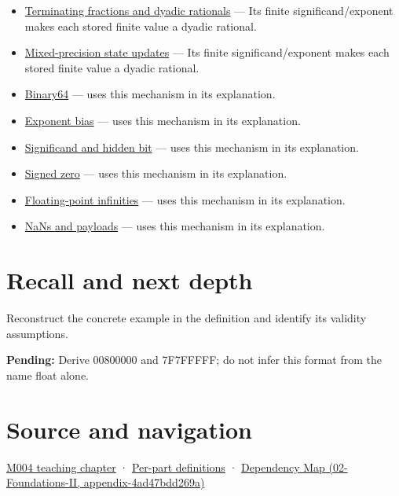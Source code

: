 \begin{itemize}
\item
  \hyperref[appendix-2a2f1b74bdd3]{Terminating fractions and dyadic rationals} --- Its finite significand/exponent makes each stored finite value a dyadic rational.
\item
  \hyperref[appendix-260182e617b7]{Mixed-precision state updates} --- Its finite significand/exponent makes each stored finite value a dyadic rational.
\item
  \hyperref[appendix-5078dfab64e6]{Binary64} --- uses this mechanism in its explanation.
\item
  \hyperref[appendix-2fae058c82e1]{Exponent bias} --- uses this mechanism in its explanation.
\item
  \hyperref[appendix-a24fd710cf67]{Significand and hidden bit} --- uses this mechanism in its explanation.
\item
  \hyperref[appendix-3a048f032c1f]{Signed zero} --- uses this mechanism in its explanation.
\item
  \hyperref[appendix-eb336149c00a]{Floating-point infinities} --- uses this mechanism in its explanation.
\item
  \hyperref[appendix-d6607cc4c235]{NaNs and payloads} --- uses this mechanism in its explanation.
\end{itemize}

\section{Recall and next depth}\label{appendix-5057f9ad327f-recall-and-next-depth}

Reconstruct the concrete example in the definition and identify its validity assumptions.

\textbf{Pending:} Derive 00800000 and 7F7FFFFF; do not infer this format from the name float alone.

\section{Source and navigation}\label{appendix-5057f9ad327f-source-and-navigation}

\href{Continuous\%20Notes/Computing\%20Foundations\%20-\%20From\%20Bits\%20to\%20C++\%20and\%20Systems\%20APIs\#A\%20stretching\%20ruler\%20for\%20real-valued\%20quantities}{M004 teaching chapter} · \hyperref[appendix-fd090d982a15-m004---parts-61-76]{Per-part definitions} · \href{../02-Foundations-II/main.pdf\#nameddest=appendix-4ad47bdd269a}{Dependency Map (02-Foundations-II, appendix-4ad47bdd269a)}
